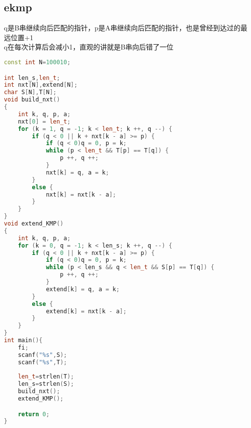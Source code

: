 \subsection{ekmp}
	q是B串继续向后匹配的指针，p是A串继续向后匹配的指针，也是曾经到达过的最远位置+1\\
	q在每次计算后会减小1，直观的讲就是B串向后错了一位
	
		\begin{lstlisting}[language=c++]
const int N=100010;

int len_s,len_t;
int nxt[N],extend[N];
char S[N],T[N];
void build_nxt()
{
	int k, q, p, a;
	nxt[0] = len_t;
	for (k = 1, q = -1; k < len_t; k ++, q --) {
		if (q < 0 || k + nxt[k - a] >= p) {
			if (q < 0)q = 0, p = k;
			while (p < len_t && T[p] == T[q]) {
				p ++, q ++;
			}
			nxt[k] = q, a = k;
		}
		else {
			nxt[k] = nxt[k - a];
		}
	}
}
void extend_KMP()
{
	int k, q, p, a;
	for (k = 0, q = -1; k < len_s; k ++, q --) {
		if (q < 0 || k + nxt[k - a] >= p) {
			if (q < 0)q = 0, p = k;
			while (p < len_s && q < len_t && S[p] == T[q]) {
				p ++, q ++;
			}
			extend[k] = q, a = k;
		}
		else {
			extend[k] = nxt[k - a];
		}
	}
}
int main(){
	fi;
	scanf("%s",S);
	scanf("%s",T);
	
	len_t=strlen(T);
	len_s=strlen(S);
	build_nxt();
	extend_KMP();

	return 0;
}
		\end{lstlisting}
